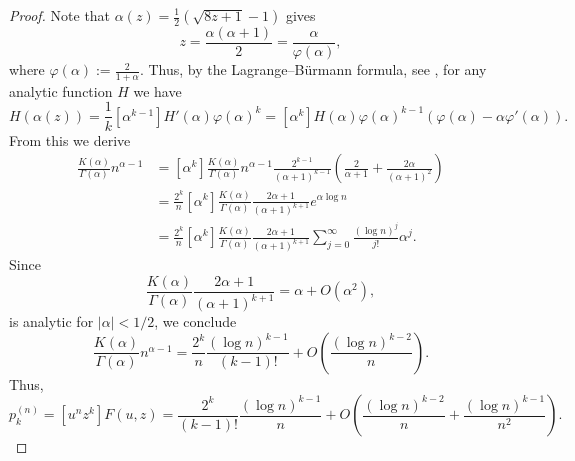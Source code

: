 \documentclass[11pt,a4paper]{article}
\numberwithin{equation}{section}
\begin{document}
\begin{proof}
    Note that $\alpha(z) = \frac{1}{2}(\sqrt{8z+1}-1)$ gives
    \begin{equation*}
        z = \frac{\alpha(\alpha+1)}{2} = \frac{\alpha}{\varphi(\alpha)},
    \end{equation*}
    where $\varphi(\alpha):=\frac{2}{1+\alpha}$.
    Thus, by the Lagrange--Bürmann formula, see \cite[Section 7.32]{WiWat}, for any analytic function $H$ we have
    \begin{equation*}
        [z^k] H(\alpha(z)) = \frac{1}{k} [\alpha^{k-1}] H'(\alpha) \varphi(\alpha)^k = [\alpha^k] H(\alpha) \varphi(\alpha)^{k-1}(\varphi(\alpha)-\alpha\varphi'(\alpha)).
    \end{equation*}
    From this we derive
    \begin{align*}
        [z^k] \frac{K(\alpha)}{\Gamma(\alpha)} n^{\alpha-1} 
            &= [\alpha^{k}] \frac{K(\alpha)}{\Gamma(\alpha)} n^{\alpha-1} \frac{2^{k-1}}{(\alpha+1)^{k-1}} 
                \left(\frac{2}{\alpha+1} + \frac{2\alpha}{(\alpha+1)^2}\right)\\
            &= \frac{2^k}{n} [\alpha^k] \frac{K(\alpha)}{\Gamma(\alpha)} \frac{2\alpha+1}{(\alpha+1)^{k+1}} e^{\alpha \log n}\\
            &= \frac{2^k}{n} [\alpha^k] \frac{K(\alpha)}{\Gamma(\alpha)} \frac{2\alpha+1}{(\alpha+1)^{k+1}} \sum_{j=0}^\infty \frac{(\log n)^j}{j!} \alpha^j.
    \end{align*}
    Since 
    \begin{equation*}
        \frac{K(\alpha)}{\Gamma(\alpha)} \frac{2\alpha+1}{(\alpha+1)^{k+1}} = \alpha + O(\alpha^2),
    \end{equation*}
    is analytic for $|\alpha|<1/2$,
    we conclude
    \begin{equation*}
        [z^k] \frac{K(\alpha)}{\Gamma(\alpha)} n^{\alpha-1} = \frac{2^k}{n} \frac{(\log n)^{k-1}}{(k-1)!} + O\left(\frac{(\log n)^{k-2}}{n}\right).
    \end{equation*}
    Thus,
    \begin{equation*}
        p_k^{(n)} = [u^n z^k]F(u,z) = \frac{2^k}{(k-1)!} \frac{(\log n)^{k-1}}{n} + O\left(\frac{(\log n)^{k-2}}{n} + \frac{(\log n)^{k-1}}{n^2}\right).
    \end{equation*}
    

\end{proof}
\end{document}
